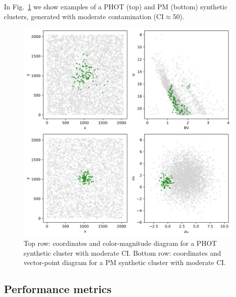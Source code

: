 \documentclass{aa}
\begin{document}
 In Fig.~\ref{fig:synth_clust} we show examples of a PHOT (top) and PM
 (bottom) synthetic clusters, generated with moderate contamination 
 (CI$\approx$50).


 \begin{figure}
 \includegraphics[width=\hsize]{figs/synth_clusts.png}
 \caption{Top row: coordinates and color-magnitude diagram for a PHOT synthetic
 cluster with moderate CI.
 Bottom row: coordinates and vector-point diagram for a PM synthetic
 cluster with moderate CI.}
 \label{fig:synth_clust}
 \end{figure}



\subsection{Performance metrics}
 \label{ssec:performance}

\end{document}
